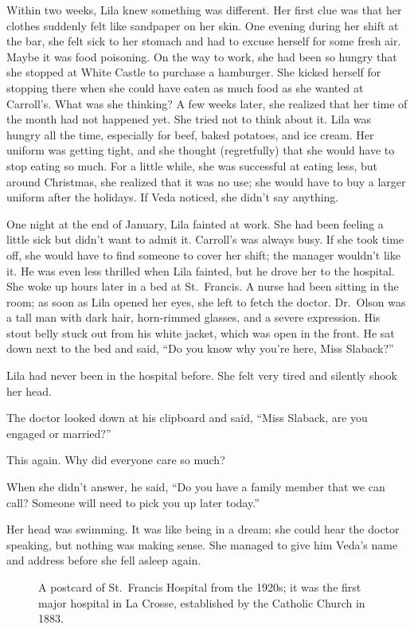 \documentclass[
  letterpaper,
]{book}
\makeatletter
\newcommand*\pandocbounded[1]{%
  \sbox\pandoc@box{#1}%
  \Gscale@div\@tempa{\textheight}{\dimexpr\ht\pandoc@box+\dp\pandoc@box\relax}%
  \Gscale@div\@tempb{\linewidth}{\wd\pandoc@box}%
  \ifdim\@tempb\p@<\@tempa\p@\let\@tempa\@tempb\fi%
  \ifdim\@tempa\p@<\p@\scalebox{\@tempa}{\usebox\pandoc@box}%
  \else\usebox{\pandoc@box}%
  \fi%
}
\makeatother
\begin{document}
Within two weeks, Lila knew something was different. Her first clue was
that her clothes suddenly felt like sandpaper on her skin. One evening
during her shift at the bar, she felt sick to her stomach and had to
excuse herself for some fresh air. Maybe it was food poisoning. On the
way to work, she had been so hungry that she stopped at White Castle to
purchase a hamburger. She kicked herself for stopping there when she
could have eaten as much food as she wanted at Carroll's. What was she
thinking? A few weeks later, she realized that her time of the month had
not happened yet. She tried not to think about it. Lila was hungry all
the time, especially for beef, baked potatoes, and ice cream. Her
uniform was getting tight, and she thought (regretfully) that she would
have to stop eating so much. For a little while, she was successful at
eating less, but around Christmas, she realized that it was no use; she
would have to buy a larger uniform after the holidays. If Veda noticed,
she didn't say anything.

One night at the end of January, Lila fainted at work. She had been
feeling a little sick but didn't want to admit it. Carroll's was always
busy. If she took time off, she would have to find someone to cover her
shift; the manager wouldn't like it. He was even less thrilled when Lila
fainted, but he drove her to the hospital. She woke up hours later in a
bed at St.~Francis. A nurse had been sitting in the room; as soon as
Lila opened her eyes, she left to fetch the doctor. Dr.~Olson was a tall
man with dark hair, horn-rimmed glasses, and a severe expression. His
stout belly stuck out from his white jacket, which was open in the
front. He sat down next to the bed and said, ``Do you know why you're
here, Miss Slaback?''

Lila had never been in the hospital before. She felt very tired and
silently shook her head.

The doctor looked down at his clipboard and said, ``Miss Slaback, are
you engaged or married?''

This again. Why did everyone care so much?

When she didn't answer, he said, ``Do you have a family member that we
can call? Someone will need to pick you up later today.''

Her head was swimming. It was like being in a dream; she could hear the
doctor speaking, but nothing was making sense. She managed to give him
Veda's name and address before she fell asleep again.

\begin{figure}[H]

{\centering \pandocbounded{\texttt{[image: images/Akou18.jpg]}}

}

\caption[A postcard of St.~Francis Hospital from the 1920s]{A postcard
of St.~Francis Hospital from the 1920s; it was the first major hospital
in La Crosse, established by the Catholic Church in 1883.}

\end{figure}%
\end{document}
